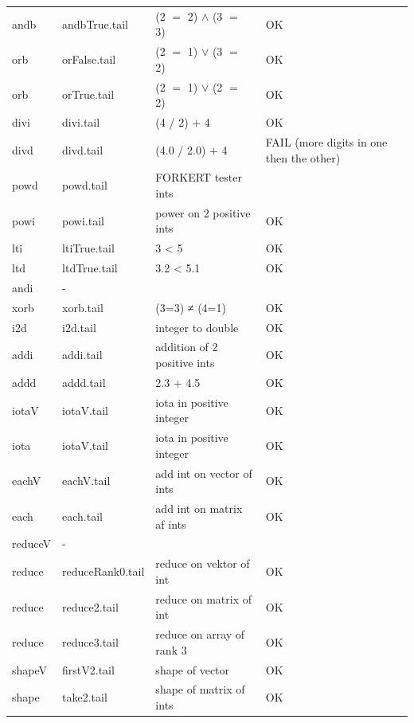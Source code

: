 \documentclass[11pt]{article}
\begin{document}
\begin{center}
\begin{tabular}{l l l l}
andb 		& andbTrue.tail 		& (2 $=$ 2) $\land$ (3 $=$ 3)	& OK \\
orb			& orFalse.tail		& (2 $=$ 1) $\lor$ (3 $=$ 2)		& OK \\
orb			& orTrue.tail		& (2 $=$ 1) $\lor$ (2 $=$ 2)		& OK \\
divi 			& divi.tail			& (4 / 2) + 4				& OK \\
divd			& divd.tail			& (4.0 / 2.0) + 4				& FAIL (more digits in one then the other)\\
powd			& powd.tail			&  FORKERT tester ints		&  \\
powi			& powi.tail			& power on 2 positive ints		& OK \\
lti			& ltiTrue.tail 		& 3 < 5					& OK \\
ltd			& ltdTrue.tail 		& 3.2 < 5.1					& OK \\
andi			& - 				& 				          	& \\
xorb			&  xorb.tail 		& (3=3) ≠ (4=1)				& OK \\
i2d 			& i2d.tail			& integer to double 			& OK \\
addi 			& addi.tail 			& addition of 2 positive ints		& OK \\ 
addd 		& addd.tail 		& 2.3 + 4.5					& OK \\
iotaV 		& iotaV.tail			& iota in positive integer		& OK \\
iota	 		& iotaV.tail			& iota in positive integer		& OK \\
eachV		& eachV.tail  		& add int on vector of ints 		& OK \\
each			& each.tail			& add int on matrix af ints 		& OK \\
reduceV		& - 				&						&  \\
reduce		& reduceRank0.tail	& reduce on vektor of int		& OK \\
reduce 		& reduce2.tail		& reduce on matrix of int		& OK \\
reduce 		& reduce3.tail		& reduce on array of rank 3 	& OK \\	
shapeV		& firstV2.tail		& shape of vector			& OK \\
shape		& take2.tail		& shape of matrix of ints		& OK \\
\end{tabular}
\end{center}
\end{document}
